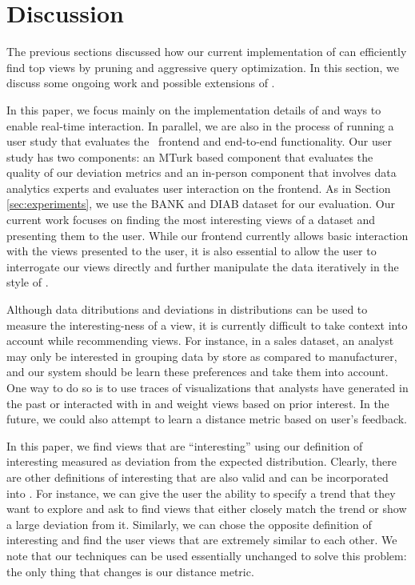 

\section{Discussion}
\label{sec:discussion}
The previous sections discussed how our current implementation of \VizRecDB can
efficiently find top views by pruning and aggressive query optimization.
In this section, we discuss some ongoing work and possible extensions of
\VizRecDB.

In this paper, we focus mainly on the implementation details of \VizRecDB and
ways to enable real-time interaction.
In parallel, we are also in the process of running a user study that evaluates
the \SeeDB\ frontend and end-to-end functionality. 
Our user study has two components: an MTurk\cite{} based component that
evaluates the quality of our deviation metrics and an in-person component that
involves data analytics experts and evaluates user interaction on the
frontend.
As in Section \ref{sec:experiments}, we use the BANK and DIAB dataset for our
evaluation.
Our current work focuses on finding the most interesting views of a dataset and
presenting them to the user.
While our frontend currently allows basic interaction with the views presented
to the user, it is also essential to allow the user to interrogate our views
directly and further manipulate the data iteratively in the style of
\cite{2013-immens}.

Although data ditributions and deviations in distributions can be used to
measure the interesting-ness of a view, it is currently difficult to take
context into account while recommending views.
For instance, in a sales dataset, an analyst may only be interested in grouping
data by store as compared to manufacturer, and our system should be learn these
preferences and take them into account.
One way to do so is to use traces of visualizations that analysts have generated
in the past or interacted with in \SeeDB and weight views based on prior
interest.
 In the future, we could also attempt to learn a distance metric based on user's
 feedback. 
 
 In this paper, we find views that are ``interesting'' using our definition of
 interesting measured as deviation from the expected distribution.
 Clearly, there are other definitions of interesting that are also valid and can
 be incorporated into \SeeDB.
 For instance, we can give the user the ability to specify a trend that they
 want to explore and ask \SeeDB to find views that either closely match the
 trend or show a large deviation from it.
 Similarly, we can chose the opposite definition of interesting and find the
 user views that are extremely similar to each other.
 We note that our techniques can be used essentially unchanged to solve this
 problem: the only thing that changes is our distance metric.
 
